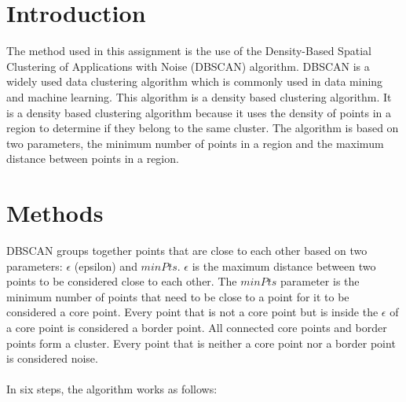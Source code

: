 \documentclass[twoside, a4paper, fleqn, reqno]{article}
\begin{document}
\maketitle

\section{Introduction}

The method used in this assignment is the use of the Density-Based Spatial Clustering of Applications with Noise (DBSCAN) algorithm. 
DBSCAN is a widely used data clustering algorithm which is commonly used in data mining and machine learning.
This algorithm is a density based clustering algorithm. 
It is a density based clustering algorithm because it uses the density of points in a region to determine if they belong to the same cluster. 
The algorithm is based on two parameters, the minimum number of points in a region and the maximum distance between points in a region. 

\section{Methods}

DBSCAN groups together points that are close to each other based on two parameters: $\epsilon$ (epsilon) and $minPts$.
$\epsilon$ is the maximum distance between two points to be considered close to each other.
The $minPts$ parameter is the minimum number of points that need to be close to a point for it to be considered a core point.
Every point that is not a core point but is inside the $\epsilon$ of a core point is considered a border point.
All connected core points and border points form a cluster. Every point that is neither a core point nor a border point is considered noise.
\\\\In six steps, the algorithm works as follows:
\end{document}
